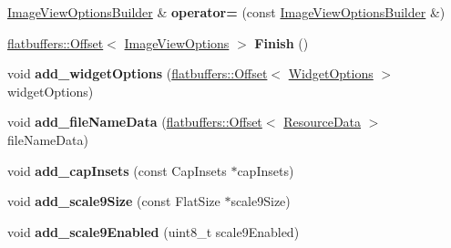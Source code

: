 \begin{DoxyCompactItemize}
\hyperlink{structflatbuffers_1_1ImageViewOptionsBuilder}{Image\+View\+Options\+Builder} \& {\bfseries operator=} (const \hyperlink{structflatbuffers_1_1ImageViewOptionsBuilder}{Image\+View\+Options\+Builder} \&)
\item 
\mbox{\label{structflatbuffers_1_1ImageViewOptionsBuilder_a4465e1485684725db29a29aeee8addf9}} 
\hyperlink{structflatbuffers_1_1Offset}{flatbuffers\+::\+Offset}$<$ \hyperlink{structflatbuffers_1_1ImageViewOptions}{Image\+View\+Options} $>$ {\bfseries Finish} ()
\item 
\mbox{\label{structflatbuffers_1_1ImageViewOptionsBuilder_ab4a6d822b9b8bb465e63cb2c61353954}} 
void {\bfseries add\+\_\+widget\+Options} (\hyperlink{structflatbuffers_1_1Offset}{flatbuffers\+::\+Offset}$<$ \hyperlink{structflatbuffers_1_1WidgetOptions}{Widget\+Options} $>$ widget\+Options)
\item 
\mbox{\label{structflatbuffers_1_1ImageViewOptionsBuilder_a13aa08de468d08f4e260f3143a3c1ce0}} 
void {\bfseries add\+\_\+file\+Name\+Data} (\hyperlink{structflatbuffers_1_1Offset}{flatbuffers\+::\+Offset}$<$ \hyperlink{structflatbuffers_1_1ResourceData}{Resource\+Data} $>$ file\+Name\+Data)
\item 
\mbox{\label{structflatbuffers_1_1ImageViewOptionsBuilder_adff4f11d16b06dd63b760606e109b9de}} 
void {\bfseries add\+\_\+cap\+Insets} (const Cap\+Insets $\ast$cap\+Insets)
\item 
\mbox{\label{structflatbuffers_1_1ImageViewOptionsBuilder_a2a0e7ced20ad208e321664bcd532b7ca}} 
void {\bfseries add\+\_\+scale9\+Size} (const Flat\+Size $\ast$scale9\+Size)
\item 
\mbox{\label{structflatbuffers_1_1ImageViewOptionsBuilder_af87456c01219834ea424820c4779c1df}} 
void {\bfseries add\+\_\+scale9\+Enabled} (uint8\+\_\+t scale9\+Enabled)
\item 
\mbox{\label{structflatbuffers_1_1ImageViewOptionsBuilder_aeba1f0dbef8693058fef71b817e1e5ef}} 

\end{DoxyCompactItemize}
